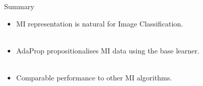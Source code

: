 \documentclass{beamer}
\begin{document}
\begin{frame}{Summary}

  \begin{itemize}
  \item
      MI representation is \alert{natural} for Image Classification. \\ ~
  \item
      AdaProp propositionalises MI data using the \alert{base learner}. \\ ~
  \item
      \alert{Comparable performance} to other MI algorithms. %
  \end{itemize}
  
\end{frame}
\end{document}
